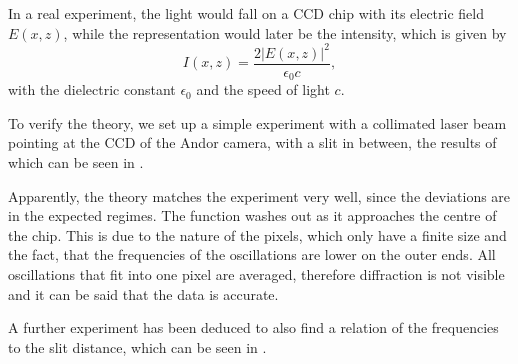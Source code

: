 In a real experiment, the light would fall on a CCD chip with its electric field $E(x,z)$, while the representation would later be the intensity, which is given by
\begin{equation}
I(x,z) = \frac{2 \lvert E(x,z) \rvert ^2}{\epsilon_0 c} ,
\end{equation}
with the dielectric constant $\epsilon_0$ and the speed of light $c$.

To verify the theory, we set up a simple experiment with a collimated laser beam pointing at the CCD of the Andor camera, with a slit in between, the results of which can be seen in .


Apparently, the theory matches the experiment very well, since the deviations are in the expected regimes.
The function washes out as it approaches the centre of the chip. This is due to the nature of the pixels, which only have a finite size and the fact, that the frequencies of the oscillations are lower on the outer ends. All oscillations that fit into one pixel are averaged, therefore diffraction is not visible and it can be said that the data is accurate.

A further experiment has been deduced to also find a relation of the frequencies to the slit distance, which can be seen in .


